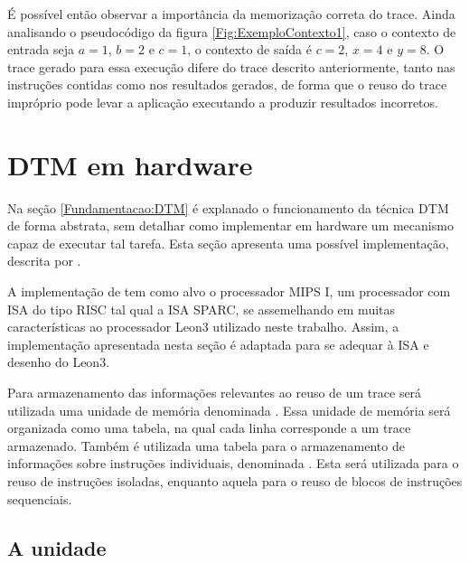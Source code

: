 É possível então observar a importância da memorização correta do trace. Ainda analisando o pseudocódigo da figura \ref{Fig:ExemploContexto1}, caso o contexto de entrada seja $a = 1$, $b = 2$ e $c = 1$, o contexto de saída é $c = 2$, $x = 4$ e $y = 8$. O trace gerado para essa execução difere do trace descrito anteriormente, tanto nas instruções contidas como nos resultados gerados, de forma que o reuso do trace impróprio pode levar a aplicação executando a produzir resultados incorretos.

\section{DTM em hardware}
\label{Fundamentacao:DTMHardware}

Na seção \ref{Fundamentacao:DTM} é explanado o funcionamento da técnica DTM de forma abstrata, sem detalhar como implementar em hardware um mecanismo capaz de executar tal tarefa. Esta seção apresenta uma possível implementação, descrita por .

A implementação de  tem como alvo o processador MIPS I, um processador com ISA do tipo RISC tal qual a ISA SPARC, se assemelhando em muitas características ao processador Leon3 utilizado neste trabalho. Assim, a implementação apresentada nesta seção é adaptada para se adequar à ISA e desenho do Leon3.

Para armazenamento das informações relevantes ao reuso de um trace será utilizada uma unidade de memória denominada \tablet. Essa unidade de memória será organizada como uma tabela, na qual cada linha corresponde a um trace armazenado. Também é utilizada uma tabela para o armazenamento de informações sobre instruções individuais, denominada \tableg. Esta será utilizada para o reuso de instruções isoladas, enquanto aquela para o reuso de blocos de instruções sequenciais.

\subsection{A unidade \tableg}
\label{Fundamentacao:DTMHardware:TableG}

